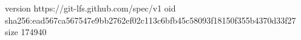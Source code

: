 version https://git-lfs.github.com/spec/v1
oid sha256:ead567ca567547e9bb2762ef02c113c6bfb45c58093f18150f355b4370d33f27
size 174940
